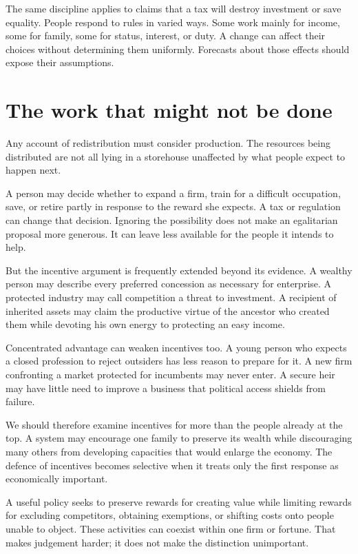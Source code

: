 \documentclass[12pt,a4paper]{book}
\begin{document}
The same discipline applies to claims that a tax will destroy investment or save equality. People respond to rules in varied ways. Some work mainly for income, some for family, some for status, interest, or duty. A change can affect their choices without determining them uniformly. Forecasts about those effects should expose their assumptions.

\section*{The work that might not be done}

Any account of redistribution must consider production. The resources being distributed are not all lying in a storehouse unaffected by what people expect to happen next.

A person may decide whether to expand a firm, train for a difficult occupation, save, or retire partly in response to the reward she expects. A tax or regulation can change that decision. Ignoring the possibility does not make an egalitarian proposal more generous. It can leave less available for the people it intends to help.

But the incentive argument is frequently extended beyond its evidence. A wealthy person may describe every preferred concession as necessary for enterprise. A protected industry may call competition a threat to investment. A recipient of inherited assets may claim the productive virtue of the ancestor who created them while devoting his own energy to protecting an easy income.

Concentrated advantage can weaken incentives too. A young person who expects a closed profession to reject outsiders has less reason to prepare for it. A new firm confronting a market protected for incumbents may never enter. A secure heir may have little need to improve a business that political access shields from failure.

We should therefore examine incentives for more than the people already at the top. A system may encourage one family to preserve its wealth while discouraging many others from developing capacities that would enlarge the economy. The defence of incentives becomes selective when it treats only the first response as economically important.

A useful policy seeks to preserve rewards for creating value while limiting rewards for excluding competitors, obtaining exemptions, or shifting costs onto people unable to object. These activities can coexist within one firm or fortune. That makes judgement harder; it does not make the distinction unimportant.
\end{document}
